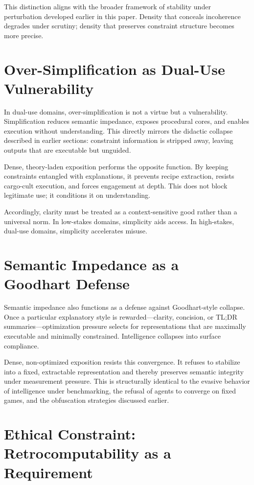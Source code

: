 This distinction aligns with the broader framework of stability under perturbation developed earlier in this paper. Density that conceals incoherence degrades under scrutiny; density that preserves constraint structure becomes more precise.

\section{Over-Simplification as Dual-Use Vulnerability}
\label{sec:simplicity}

In dual-use domains, over-simplification is not a virtue but a vulnerability. Simplification reduces semantic impedance, exposes procedural cores, and enables execution without understanding. This directly mirrors the didactic collapse described in earlier sections: constraint information is stripped away, leaving outputs that are executable but unguided.

Dense, theory-laden exposition performs the opposite function. By keeping constraints entangled with explanations, it prevents recipe extraction, resists cargo-cult execution, and forces engagement at depth. This does not block legitimate use; it conditions it on understanding.

Accordingly, clarity must be treated as a context-sensitive good rather than a universal norm. In low-stakes domains, simplicity aids access. In high-stakes, dual-use domains, simplicity accelerates misuse.

\section{Semantic Impedance as a Goodhart Defense}
\label{sec:goodhart}

Semantic impedance also functions as a defense against Goodhart-style collapse. Once a particular explanatory style is rewarded---clarity, concision, or TL;DR summaries---optimization pressure selects for representations that are maximally executable and minimally constrained. Intelligence collapses into surface compliance.

Dense, non-optimized exposition resists this convergence. It refuses to stabilize into a fixed, extractable representation and thereby preserves semantic integrity under measurement pressure. This is structurally identical to the evasive behavior of intelligence under benchmarking, the refusal of agents to converge on fixed games, and the obfuscation strategies discussed earlier.

\section{Ethical Constraint: Retrocomputability as a Requirement}
\label{sec:ethics}

